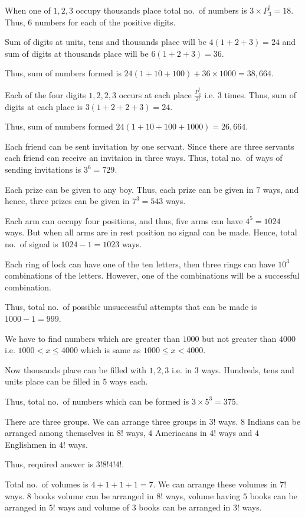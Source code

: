   When one of $1, 2, 3$ occupy thousand\symbol[rightquote]s place total no.\ of numbers is $3\times P_3^^3 = 18$. Thus, $6$
  numbers for each of the positive digits.

  Sum of digits at units, tens and thousands place will be $4(1 + 2 + 3) = 24$ and sum of digits at
  thousands place will be $6(1 + 2 + 3) = 36$.

  Thus, sum of numbers formed is $24(1 + 10 + 100) + 36\times 1000 = 38,664$.
\item Each of the four digits $1, 2, 2, 3$ occurs at each place $\frac{P_3^^3}{2!}$ i.e. $3$ times. Thus,
  sum of digits at each place is $3(1 + 2 + 2 + 3) = 24$.

  Thus, sum of numbers formed $24(1 + 10 + 100 + 1000) = 26,664$.
\item Each friend can be sent invitation by one servant. Since there are three servants each friend can
  receive an invitaion in three ways. Thus, total no.\ of ways of sending invitations is $3^6 = 729$.
\item Each prize can be given to any boy. Thus, each prize can be given in $7$ ways, and hence, three
  prizes can be given in $7^3 = 543$ ways.
\item Each arm can occupy four positions, and thus, five arms can have $4^5 = 1024$ ways. But when all arms
  are in rest position no signal can be made. Hence, total no.\ of signal is $1024 -1 = 1023$ ways.
\item Each ring of lock can have one of the ten letters, then three rings can have $10^3$ combinations of
  the letters. However, one of the combinations will be a successful combination.

  Thus, total no.\ of possible unsuccessful attempts that can be made is $1000 - 1 = 999$.
\item We have to find numbers which are greater than $1000$ but not greater than $4000$ i.e. $1000< x\leq
  4000$ which is same as $1000\leq x < 4000$.

  Now thousands place can be filled with $1, 2, 3$ i.e. in $3$ ways. Hundreds, tens and units place can be
  filled in $5$ ways each.

  Thus, total no.\ of numbers which can be formed is $3\times 5^3 = 375$.
\item There are three groups. We can arrange three groups in $3!$ ways. $8$ Indians can be arranged among
  themselves in $8!$ ways, $4$ Ameriacans in $4!$ ways and $4$ Englishmen in $4!$ ways.

  Thus, required answer is $3!8!4!4!$.
\item Total no.\ of volumes is $4 + 1 + 1 + 1 = 7$. We can arrange these volumes in $7!$ ways. $8$ books
  volume can be arranged in $8!$ ways, volume having $5$ books can be arranged in $5!$ ways and volume of
  $3$ books can be arranged in $3!$ ways.

